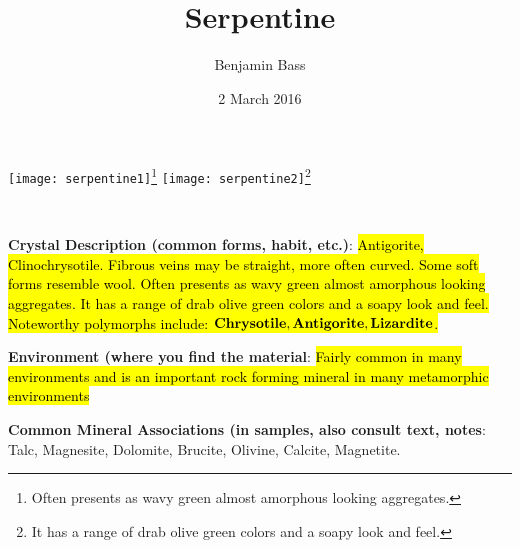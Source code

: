 \documentclass[10pt]{article}
\author{Benjamin Bass}
\date{2 March 2016}
\title{\vspace{-2.0cm}Serpentine} %
\begin{document}
\maketitle


\begin{center}
  \texttt{[image: serpentine1]}\footnote{Often presents as wavy green almost amorphous looking aggregates.}
  \texttt{[image: serpentine2]}\footnote{It has a range of drab olive green colors and a soapy look and feel.}
\end{center}



\
\
\
\
\
\
\
\
\
\

\begin{framed}
  \textbf{Crystal Description (common forms, habit, etc.)}: \hl{Antigorite, Clinochrysotile. Fibrous veins may be straight, more often curved. Some soft forms resemble wool. Often presents as wavy green almost amorphous looking aggregates. It has a range of drab olive green colors and a soapy look and feel. Noteworthy polymorphs include: $\bf{Chrysotile}, \bf{Antigorite}, \bf{Lizardite}$.}
\end{framed}

\begin{framed}
  \textbf{Environment (where you find the material}: \hl{Fairly common in many environments and is an important rock forming mineral in many metamorphic environments}
\end{framed}

\begin{framed}
  \textbf{Common Mineral Associations (in samples, also consult text, notes}: Talc, Magnesite, Dolomite, Brucite, Olivine, Calcite, Magnetite.
\end{framed}
\end{document}
